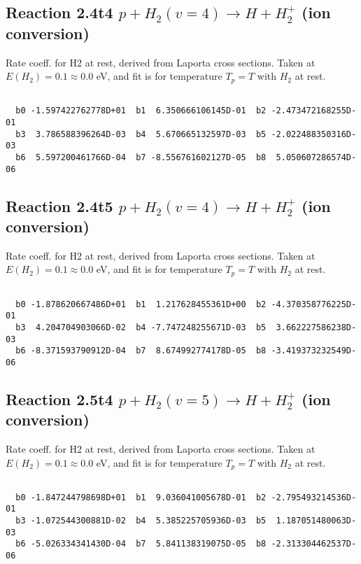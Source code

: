 \documentclass[12pt,dvipdfmx]{article}
\begin{document}
\newpage
\subsection{
Reaction 2.4t4
$ p + H_2(v=4) \rightarrow H + H_2^+$ (ion conversion)
}
Rate coeff. for H2 at rest, derived from Laporta cross sections.
Taken at $E(H_2) = 0.1 \approx 0.0$ eV,  and fit is for temperature $T_p=T$ with $H_2$ at rest.

\begin{small}\begin{verbatim}

  b0 -1.597422762778D+01  b1  6.350666106145D-01  b2 -2.473472168255D-01
  b3  3.786588396264D-03  b4  5.670665132597D-03  b5 -2.022488350316D-03
  b6  5.597200461766D-04  b7 -8.556761602127D-05  b8  5.050607286574D-06

\end{verbatim}\end{small}

\newpage
\subsection{
Reaction 2.4t5
$ p + H_2(v=4) \rightarrow H + H_2^+$ (ion conversion)
}
Rate coeff. for H2 at rest, derived from Laporta cross sections.
Taken at $E(H_2) = 0.1 \approx 0.0$ eV,  and fit is for temperature $T_p=T$ with $H_2$ at rest.

\begin{small}\begin{verbatim}

  b0 -1.878620667486D+01  b1  1.217628455361D+00  b2 -4.370358776225D-01
  b3  4.204704903066D-02  b4 -7.747248255671D-03  b5  3.662227586238D-03
  b6 -8.371593790912D-04  b7  8.674992774178D-05  b8 -3.419373232549D-06

\end{verbatim}\end{small}

\newpage
\subsection{
Reaction 2.5t4
$ p + H_2(v=5) \rightarrow H + H_2^+$ (ion conversion)
}
Rate coeff. for H2 at rest, derived from Laporta cross sections.
Taken at $E(H_2) = 0.1 \approx 0.0$ eV,  and fit is for temperature $T_p=T$ with $H_2$ at rest.

\begin{small}\begin{verbatim}

  b0 -1.847244798698D+01  b1  9.036041005678D-01  b2 -2.795493214536D-01
  b3 -1.072544300881D-02  b4  5.385225705936D-03  b5  1.187051480063D-03
  b6 -5.026334341430D-04  b7  5.841138319075D-05  b8 -2.313304462537D-06

\end{verbatim}\end{small}
\end{document}
